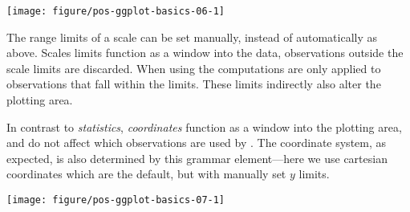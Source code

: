 \documentclass[krantz2]{krantz}\usepackage{knitr}%
\begin{document}
\begin{knitrout}\footnotesize
{}\color{fgcolor}\begin{kframe}
\begin{alltt}
\hlstd{(} 
       \hlstd{(}    \hlopt{+}
  \hlstd{()} \hlopt{+}
  \hlstd{(} \hlstd{=} \hlstd{,}  \hlstd{=} \hlstd{)} \hlopt{+}
  \hlstd{()}
\end{alltt}
\end{kframe}

{\centering \texttt{[image: figure/pos-ggplot-basics-06-1]} 

}



\end{knitrout}

The range limits of a scale can be set manually, instead of automatically as above. Scales limits function as a window into the data, observations outside the scale limits are discarded. When using  the computations are only applied to observations that fall within the limits. These limits indirectly also alter the plotting area.

In contrast to \emph{statistics}, \emph{coordinates} function as a window into the plotting area, and do not affect which observations are used by . The coordinate system, as expected, is also determined by this grammar element---here we use cartesian coordinates which are the default, but with manually set $y$ limits.

\begin{knitrout}\footnotesize
{}\color{fgcolor}\begin{kframe}
\begin{alltt}
\hlstd{(} 
       \hlstd{(}    \hlopt{+}
  \hlstd{()} \hlopt{+}
  \hlstd{(} \hlstd{=} \hlstd{,}  \hlstd{=} \hlstd{)} \hlopt{+}
  \hlstd{(} \hlstd{=} \hlstd{(}\hlstd{,} \hlstd{))}
\end{alltt}
\end{kframe}

{\centering \texttt{[image: figure/pos-ggplot-basics-07-1]} 

}



\end{knitrout}
\end{document}
